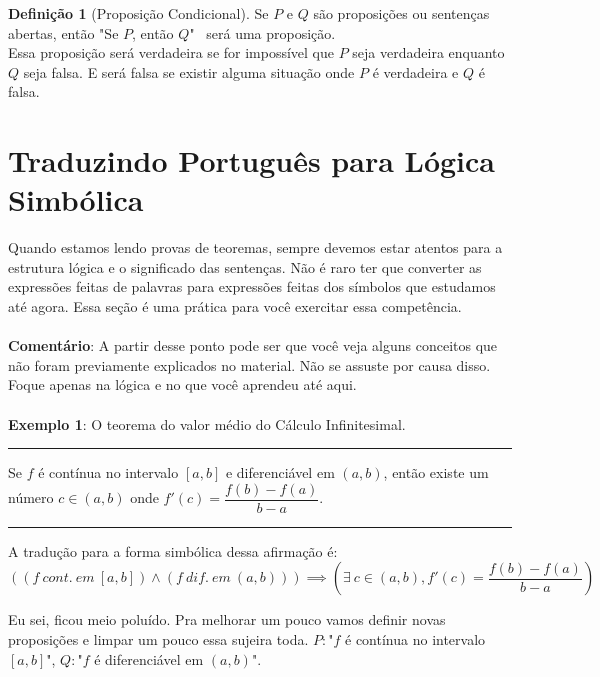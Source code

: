 \documentclass[a4paper,11pt,oneside]{book}
\theoremstyle{definition}
\theoremstyle{break}
\newtheorem{definition}{Definição}[section]
\begin{document}
\begin{definition}[Proposição Condicional]
Se $P$ e $Q$ são proposições ou sentenças abertas, então "Se $P$, então $Q$" \  será uma proposição.\\
Essa proposição será verdadeira se for impossível que $P$ seja verdadeira enquanto $Q$ seja falsa. E será falsa se existir alguma situação onde $P$ é verdadeira e $Q$ é falsa.
\end{definition}

\section{Traduzindo Português para Lógica Simbólica}

Quando estamos lendo provas de teoremas, sempre devemos estar atentos para a estrutura lógica e o significado das sentenças. Não é raro ter que converter as expressões feitas de palavras para expressões feitas dos símbolos que estudamos até agora. Essa seção é uma prática para você exercitar essa competência.
\\
\\
\textbf{Comentário}: A partir desse ponto pode ser que você veja alguns conceitos que não foram previamente explicados no material. Não se assuste por causa disso. Foque apenas na lógica e no que você aprendeu até aqui.
\\
\\
\textbf{Exemplo 1}: O teorema do valor médio do Cálculo Infinitesimal.
\\
\hrule
\vspace{5pt}
Se $f$ é contínua no intervalo $[a,b]$ e diferenciável em $(a,b)$, então existe um número $c \in (a,b)$ onde $f'(c) = \dfrac{f(b) - f(a)}{b - a}$.
\vspace{5pt}
\hrule
\vspace{5pt}
A tradução para a forma simbólica dessa afirmação é:
$$ \left( (f \ cont. \ em \  [a,b]) \land (f \ dif. \ em \  (a,b)) \right) \implies \left(\exists \ c \in (a,b), f'(c) = \dfrac{f(b) - f(a)}{b - a} \right) $$

Eu sei, ficou meio poluído. Pra melhorar um pouco vamos definir novas proposições e limpar um pouco essa sujeira toda. $P : $"$f$ é contínua no intervalo $[a,b]$", $Q : $"$f$ é diferenciável em $(a,b)$".
\end{document}
